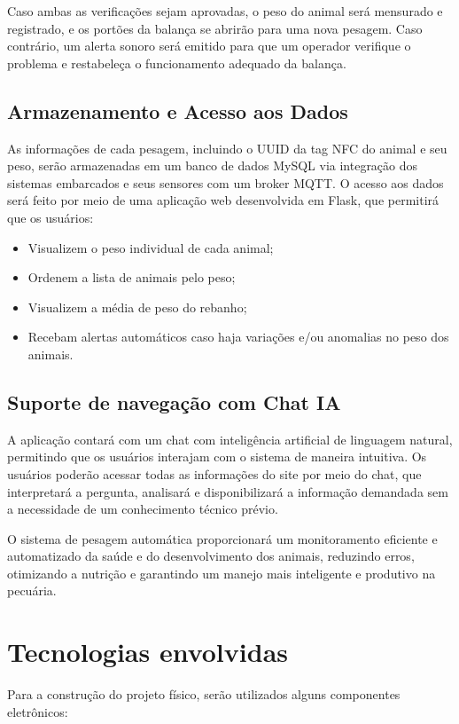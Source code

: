 \documentclass[11pt]{article}
\begin{document}
Caso ambas as verificações sejam aprovadas, o peso do animal será mensurado e registrado, e os portões da balança se abrirão para uma nova pesagem. Caso contrário, um alerta sonoro será emitido para que um operador verifique o problema e restabeleça o funcionamento adequado da balança.

\subsection{Armazenamento e Acesso aos Dados}
As informações de cada pesagem, incluindo o UUID da tag NFC do animal e seu peso, serão armazenadas em um banco de dados MySQL via integração dos sistemas embarcados e seus sensores com um broker MQTT. O acesso aos dados será feito por meio de uma aplicação web desenvolvida em Flask, que permitirá que os usuários:

\begin{itemize}
    \item Visualizem o peso individual de cada animal;
    \item Ordenem a lista de animais pelo peso;
    \item Visualizem a média de peso do rebanho;
    \item Recebam alertas automáticos caso haja variações e/ou anomalias no peso dos animais.
\end{itemize}

\subsection{Suporte de navegação com Chat IA}
A aplicação contará com um chat com inteligência artificial de linguagem natural, permitindo que os usuários interajam com o sistema de maneira intuitiva. Os usuários poderão acessar todas as informações do site por meio do chat, que interpretará a pergunta, analisará e disponibilizará a informação demandada sem a necessidade de um conhecimento técnico prévio.

O sistema de pesagem automática proporcionará um monitoramento eficiente e automatizado da saúde e do desenvolvimento dos animais, reduzindo erros, otimizando a nutrição e garantindo um manejo mais inteligente e produtivo na pecuária.

\section{Tecnologias envolvidas}
Para a construção do projeto físico, serão utilizados alguns componentes eletrônicos:
\end{document}
